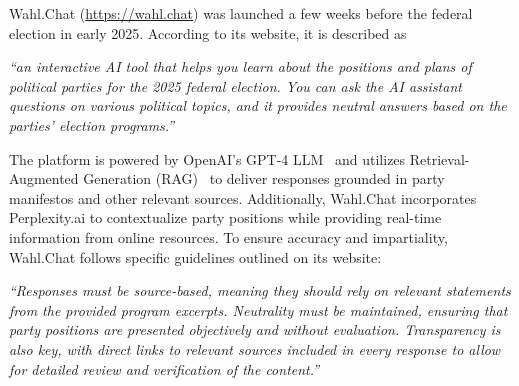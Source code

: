 \documentclass[
	fontsize=10pt,          %
	numbers=noenddot,    	%
    parskip=half,        	%
    listof=totoc,        	%
    bibliography=totoc,  	%
	headsepline=true,       %
	footsepline=false, 		%
    DIV=12                	%
]{scrartcl}
\begin{document}
Wahl.Chat (\url{https://wahl.chat})\nocite{wahlchat2025} was launched a few weeks before the federal election in early 2025.
According to its website, it is described as
\begin{displayquote}
    \itshape
    ``an interactive AI tool that helps you learn about the positions and plans of political parties for the 2025 federal election. You can ask the AI assistant questions on various political topics, and it provides neutral answers based on the parties' election programs.''
\end{displayquote}
The platform is powered by OpenAI's GPT-4 LLM~\citep{achiam2023gpt,hurst2024gpt} and utilizes Retrieval-Augmented Generation (RAG)~\citep{lewis2020retrieval} to deliver responses grounded in party manifestos and other relevant sources.
Additionally, Wahl.Chat incorporates Perplexity.ai to contextualize party positions while providing real-time information from online resources.
To ensure accuracy and impartiality, Wahl.Chat follows specific guidelines outlined on its website:
\begin{displayquote}
    \itshape
    ``Responses must be source-based, meaning they should rely on relevant statements from the provided program excerpts. Neutrality must be maintained, ensuring that party positions are presented objectively and without evaluation. Transparency is also key, with direct links to relevant sources included in every response to allow for detailed review and verification of the content.''
\end{displayquote}
\end{document}
